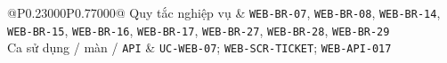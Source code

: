 \begin{longtable}{@{}P{0.23000\SRSWidth}P{0.77000\SRSWidth}@{}}
Quy tắc nghiệp vụ & \texttt{WEB-\allowbreak{}BR-\allowbreak{}07}, \texttt{WEB-\allowbreak{}BR-\allowbreak{}08}, \texttt{WEB-\allowbreak{}BR-\allowbreak{}14}, \texttt{WEB-\allowbreak{}BR-\allowbreak{}15}, \texttt{WEB-\allowbreak{}BR-\allowbreak{}16}, \texttt{WEB-\allowbreak{}BR-\allowbreak{}17}, \texttt{WEB-\allowbreak{}BR-\allowbreak{}27}, \texttt{WEB-\allowbreak{}BR-\allowbreak{}28}, \texttt{WEB-\allowbreak{}BR-\allowbreak{}29} \\[3pt]
Ca sử dụng /\allowbreak{} màn /\allowbreak{} \texttt{API} & \texttt{UC-\allowbreak{}WEB-\allowbreak{}07}; \texttt{WEB-\allowbreak{}SCR-\allowbreak{}TICKET}; \texttt{WEB-\allowbreak{}API-\allowbreak{}017} \\[3pt]
\end{longtable}
\endgroup

